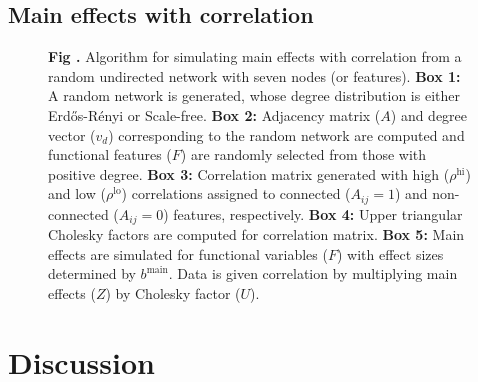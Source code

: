 \documentclass[10pt,letterpaper]{article}\usepackage[]{graphicx}\usepackage[]{color}
\begin{document}
\subsection{Main effects with correlation}

\begin{figure}[H]
	\centering
	\begin{minipage}[h]{1\textwidth}
	\end{minipage}
	
	\begin{minipage}[h]{1\textwidth}
		\noindent{}\textbf{Fig \thefigure \label{fig:main_plus_correlation_diagram}.} Algorithm for simulating main effects with correlation from a random undirected network with seven nodes (or features). \textbf{Box 1:} A random network is generated, whose degree distribution is either Erd\H{o}s-R\'{e}nyi or Scale-free. \textbf{Box 2:} Adjacency matrix ($A$) and degree vector ($v_d$) corresponding to the random network are computed and functional features ($F$) are randomly selected from those with positive degree. \textbf{Box 3:} Correlation matrix generated with high ($\rho^\text{hi}$) and low ($\rho^\text{lo}$) correlations assigned to connected ($A_{ij}=1$) and non-connected ($A_{ij}=0$) features, respectively. \textbf{Box 4:} Upper triangular Cholesky factors are computed for correlation matrix. \textbf{Box 5:} Main effects are simulated for functional variables ($F$) with effect sizes determined by $b^\text{main}$. Data is given correlation by multiplying main effects ($Z$) by Cholesky factor ($U$).
	\end{minipage}
\end{figure}

\section{Discussion}


\end{document}
